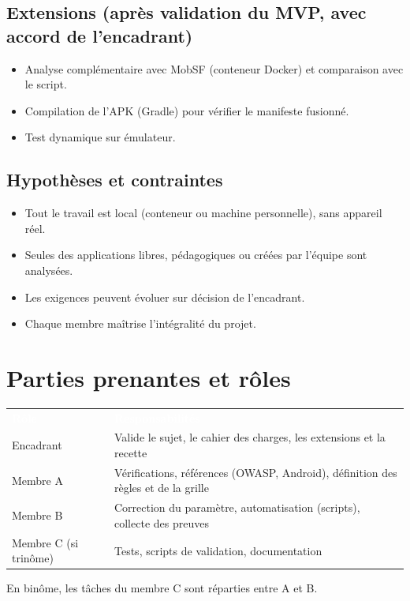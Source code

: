 \documentclass[11pt,a4paper]{article}
\newcommand{\hd}[1]{\textcolor{white}{\textbf{#1}}}
\begin{document}
\subsection{Extensions (après validation du MVP, avec accord de l'encadrant)}
\begin{itemize}
  \item Analyse complémentaire avec MobSF (conteneur Docker) et comparaison avec le script.
  \item Compilation de l'APK (Gradle) pour vérifier le manifeste fusionné.
  \item Test dynamique sur émulateur.
\end{itemize}

\subsection{Hypothèses et contraintes}
\begin{itemize}
  \item Tout le travail est local (conteneur ou machine personnelle), sans appareil réel.
  \item Seules des applications libres, pédagogiques ou créées par l'équipe sont analysées.
  \item Les exigences peuvent évoluer sur décision de l'encadrant.
  \item Chaque membre maîtrise l'intégralité du projet.
\end{itemize}

\section{Parties prenantes et rôles}
\begin{center}
\begin{tabular}{L{3.6cm}L{11cm}}
\hd{Rôle} & \hd{Responsabilités}\\
Encadrant & Valide le sujet, le cahier des charges, les extensions et la recette\\
Membre A & Vérifications, références (OWASP, Android), définition des règles et de la grille\\
Membre B & Correction du paramètre, automatisation (scripts), collecte des preuves\\
Membre C (si trinôme) & Tests, scripts de validation, documentation\\
\end{tabular}
\end{center}
En binôme, les tâches du membre C sont réparties entre A et B.
\end{document}
